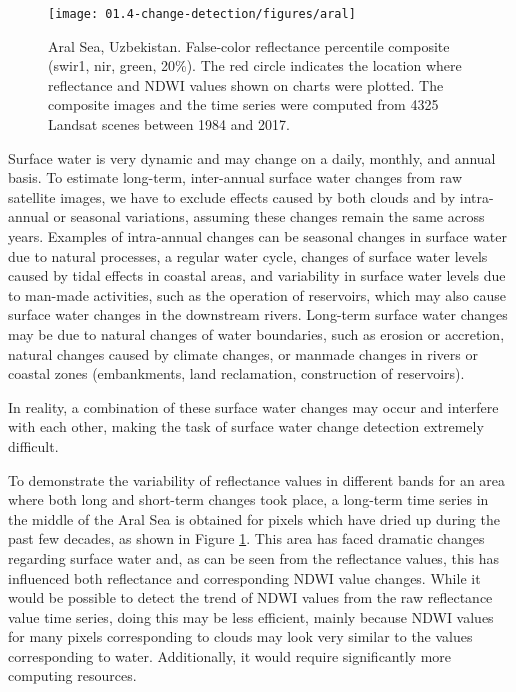 \begin{figure}[H]
	\texttt{[image: 01.4-change-detection/figures/aral]}
	\caption{Aral Sea, Uzbekistan. False-color reflectance percentile composite (swir1, nir, green, 20\%). The red circle indicates the location where reflectance and \gls{NDWI} values shown on charts were plotted. The composite images and the time series were computed from 4325 Landsat scenes between 1984 and 2017. }
	\label{fig:ch4-aral-sea}
\end{figure}

Surface water is very dynamic and may change on a daily, monthly, and annual basis. To estimate long-term, inter-annual surface water changes from raw satellite images, we have to exclude effects caused by both clouds and by intra-annual or seasonal variations, assuming these changes remain the same across years. Examples of intra-annual changes can be seasonal changes in surface water due to natural processes, a regular water cycle, changes of surface water levels caused by tidal effects in coastal areas, and variability in surface water levels due to man-made activities, such as the operation of reservoirs, which may also cause surface water changes in the downstream rivers. Long-term surface water changes may be due to natural changes of water boundaries, such as erosion or accretion, natural changes caused by climate changes, or manmade changes in rivers or coastal zones (embankments, land reclamation, construction of reservoirs). 

In reality, a combination of these surface water changes may occur and interfere with each other, making the task of surface water change detection extremely difficult.

To demonstrate the variability of reflectance values in different bands for an area where both long and short-term changes took place, a long-term time series in the middle of the Aral Sea is obtained for pixels which have dried up during the past few decades, as shown in Figure \ref{fig:ch4-aral-sea}. This area has faced dramatic changes regarding surface water and, as can be seen from the reflectance values, this has influenced both reflectance and corresponding \gls{NDWI} value changes. While it would be possible to detect the trend of \gls{NDWI} values from the raw reflectance value time series, doing this may be less efficient, mainly because \gls{NDWI} values for many pixels corresponding to clouds may look very similar to the values corresponding to water. Additionally, it would require significantly more computing resources.

